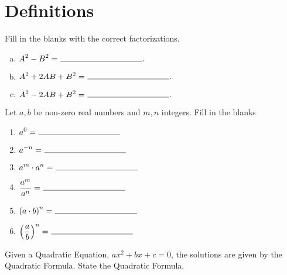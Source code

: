 \documentclass[12pt]{amsart}
\begin{document}
\section{Definitions}
\begin{thm}[3 Points]\label{ex1}
  Fill in the blanks with the correct factorizations.
  \begin{enumerate}[(a)]
  \item
    $\displaystyle{A^2 - B^2 =\ \line(1,0){100}}.$
    \vspace{.3in}
  \item
    $\displaystyle{A^2 + 2AB + B^2 =\ \line(1,0){100}}.$
    \vspace{.3in}
  \item
    $\displaystyle{A^2 - 2AB + B^2 =\ \line(1,0){100}}.$
    \vspace{.3in}
  \end{enumerate}
\end{thm}
\vspace{.5in}
\begin{thm}[6 Points]\label{ex2}
  Let $a, b$ be non-zero real numbers and $m, n$ integers.
  Fill in the blanks
  \vspace{.25in}
  \begin{multicols}{2}
    \begin{enumerate}
    \item
      $\displaystyle{a^0 =\ \line(1,0){100}}$
      \vspace{.4in}
    \item
      $\displaystyle{a^{-n} =\ \line(1,0){100}}$
      \vspace{.3in}
    \item
      $\displaystyle{a^m \cdot a^n =\ \line(1,0){100}}$
    \item
      $\displaystyle{\frac{a^m}{a^n}=\ \line(1,0){100}}$
      \vspace{.25in}
    \item
      $\displaystyle{\left(a \cdot b\right)^n=\ \line(1,0){100}}$
      \vspace{.25in}
    \item
      $\displaystyle{\left(\frac{a}{b}\right)^n=\ \line(1,0){100}}$
    \end{enumerate}
  \end{multicols}
\end{thm}
\vspace{.5in}
\begin{thm}[2 Points]\label{ex3}
  Given a Quadratic Equation, $ax^2 + bx + c = 0$, the solutions are given by the Quadratic Formula.  State the Quadratic Formula.
  \vspace{1in}
\end{thm}
\end{document}
